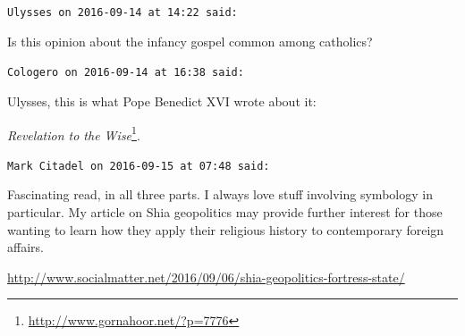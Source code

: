 \begin{footnotesize}
\begin{sffamily}
\texttt{Ulysses on 2016-09-14 at 14:22 said:}

Is this opinion about the infancy gospel common among catholics?

\hfill

\texttt{Cologero on 2016-09-14 at 16:38 said:}

Ulysses, this is what Pope Benedict XVI wrote about it:

\textit{Revelation to the Wise}\footnote{\url{http://www.gornahoor.net/?p=7776}}.


\hfill

\texttt{Mark Citadel on 2016-09-15 at 07:48 said:}

Fascinating read, in all three parts. I always love stuff involving symbology in particular. My article on Shia geopolitics may provide further interest for those wanting to learn how they apply their religious history to contemporary foreign affairs.

\url{http://www.socialmatter.net/2016/09/06/shia-geopolitics-fortress-state/}



\hfill

\end{sffamily}
\end{footnotesize}

